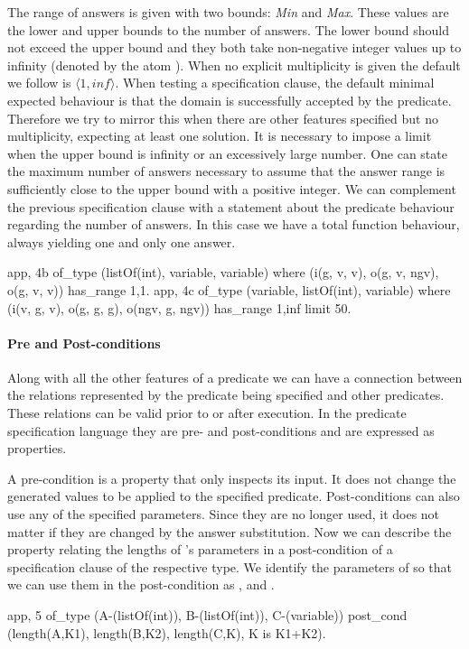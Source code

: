 The range of answers is given with two bounds: \emph{Min} and
\emph{Max}.
%
These values are the lower and upper bounds to the number of answers.
%
The lower bound should not exceed the upper bound and they both take
non-negative integer values up to infinity (denoted by the atom
).
%
When no explicit multiplicity is given the default we %
follow is
$\langle 1, inf \rangle $.
%
When testing a specification clause, the default minimal expected
behaviour is that the domain is successfully accepted by the predicate.
%
Therefore we try to mirror this when there are other features
specified but no multiplicity, expecting at least one solution.
%
It is necessary to impose a limit when the upper bound is infinity or an
excessively large number.
%
One can state the maximum number of answers necessary to assume that the
answer range is sufficiently close to the upper bound with a positive
integer.
%
We can complement the previous specification clause with a statement
about the predicate behaviour regarding the number of answers.
%
In this case we have a total function behaviour, always yielding one and
only one answer.
%
\begin{yapcode}
 {app, 4b} of_type (listOf(int), variable, variable)
    where (i(g, v, v), o(g, v, ngv), o(g, v, v))
    has_range {1,1}.
 {app, 4c} of_type (variable, listOf(int), variable)
    where (i(v, g, v), o(g, g, g), o(ngv, g, ngv))
    has_range {1,inf} limit 50.
\end{yapcode}

\paragraph{\bf Pre and Post-conditions}

Along with all the other features of a predicate we can have a
connection between the relations represented by the predicate being
specified and other predicates.
%
These relations can be valid prior to or after execution.
%
In the predicate specification language they are pre- and
post-conditions and are expressed as \plqc{} properties.


A pre-condition is a property that only inspects its input.
%
It does not change the generated values to be applied to the specified
predicate.
%
Post-conditions can also use any of the specified parameters.
%
Since they are no longer used, it does not matter if they are changed by
the answer substitution.
%
Now we can describe the property relating the lengths of 's
parameters in a post-condition of a specification clause of the
respective type.
%
We identify the parameters of  so that we can use them in the
post-condition as ,   and  .
%
\begin{yapcode}
 {app, 5} of_type (A-(listOf(int)), B-(listOf(int)), C-(variable))
   post_cond (length(A,K1), length(B,K2), length(C,K), K is K1+K2).
\end{yapcode}

